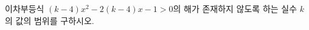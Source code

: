 \hspace*{2mm}\begin{minipage}[t]{\dimexpr\linewidth-2mm\relax}\vspace{0pt}
이차부등식 $(k-4)x^2-2(k-4)x-1>0$의 해가 존재하지 않도록 하는 실수 $k$의 값의 범위를 구하시오.\end{minipage}
